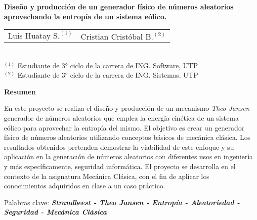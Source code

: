 \thispagestyle{fancy} %

\vspace*{-1.5cm} %

\begin{center}
  {\LARGE\bfseries
    Diseño y producción de un generador físico de números aleatorios aprovechando la entropía de un sistema eólico.\\
    }

    \vspace{0.5em}

    \begin{tabular}{ll}
    $\text{Luis Huatay S.}^{(1)}$ & $\text{Cristian Cristóbal B.}^{(2)}$
    \end{tabular} \\
    $^{(1)}$ Estudiante de 3° ciclo de la carrera de ING. Software, UTP \\
    $^{(2)}$ Estudiante de 3° ciclo de la carrera de ING. Sistemas, UTP
\end{center}
\vspace{-1cm}
\vspace{1.5em}
\begin{center}
  {\large\bfseries Resumen}
\end{center}
\vspace{-0.7cm}

En este proyecto se realiza el diseño y producción de un mecanismo \textit{Theo Jansen} generador de números aleatorios que emplea la energía cinética de un sistema eólico para aprovechar la entropía del mismo. El objetivo es crear un generador físico de números aleatorios utilizando conceptos básicos de mecánica clásica. Los resultados obtenidos pretenden demostrar la viabilidad de este enfoque y su aplicación en la generación de números aleatorios con diferentes usos en ingeniería y más específicamente, seguridad informática. El proyecto se desarrolla en el contexto de la asignatura Mecánica Clásica, con el fin de aplicar los conocimientos adquiridos en clase a un caso práctico.

\begin{center}
  Palabras clave: {\textbf{\textit{Strandbeest - Theo Jansen - Entropía - Aleatoriedad - Seguridad - Mecánica Clásica}}}
\end{center}

